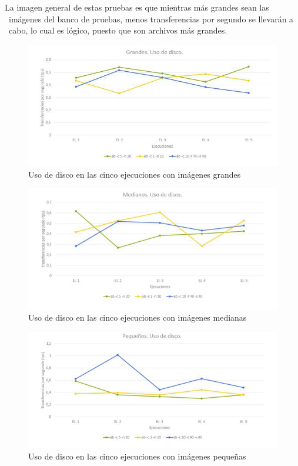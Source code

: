 \documentclass[11pt,twoside,a4paper]{book}
\begin{document}
La imagen general de estas pruebas es que mientras más grandes sean las \
imágenes del banco de pruebas, menos transferencias por segundo se llevarán a \
cabo, lo cual es lógico, puesto que son archivos más grandes.
\begin{figure}
   \includegraphics[width=\textwidth]{grafica2.jpg}
   \caption{Uso de disco en las cinco ejecuciones con imágenes grandes}
   \label{Fig2}
\end{figure}

\begin{figure}
   \includegraphics[width=\textwidth]{grafica3.jpg}
\caption{Uso de disco en las cinco ejecuciones con imágenes medianas}   \label{Fig3}
\end{figure}

\begin{figure}[H]
   \includegraphics[width=\textwidth]{grafica4.jpg}
   \caption{Uso de disco en las cinco ejecuciones con imágenes pequeñas}
   \label{Fig4}
\end{figure}
\end{document}
